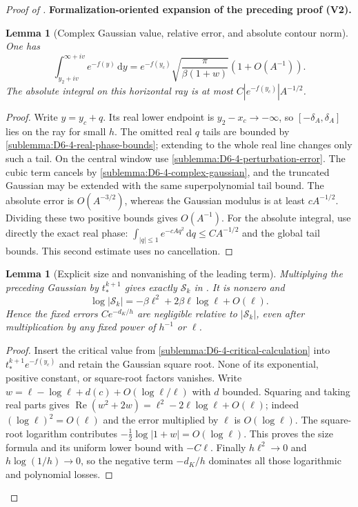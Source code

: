 \documentclass[11pt]{article}
\newtheorem{lemma}[theorem]{Lemma}
\newcommand{\formalisationparentid}{X}
\newenvironment{formalisationaddition}[1]{\par\medskip\begingroup\color{blue}\def\formalisationparentid{#1}\setcounter{formalizationsublemma}{0}\let\lemma\formalizationsublemma\let\endlemma\endformalizationsublemma
  \def\Eo{\mathcal E_h^\circ}\def\EE{\mathcal E_h}\def\phio{\phi_h^\circ}\def\phih{\phi_h}\def\Ho{H_h^{\rm atom}(v^\circ)}\def\Ha{H_h^{\rm atom}}\def\HL{H_h^{L}}\def\Dh{D_h}\def\Log{\operatorname{Log}}\def\ellh{\ell_h}\def\Gp{G_{p,h}}\def\Ast{A_{*,h}}\def\ahat{\widehat{\mathfrak a}_h}\def\ah{\mathfrak a_h}\def\rh{\widehat\rho_h}\def\deltah{\widehat\delta_h}\def\oldref##1{\textup{(##1)}}\def\interface##1{\par\noindent\textit{Analytical interface used here.} ##1\par}\def\finish{\par\noindent\textit{Conclusion of the formalization-oriented expansion.} }\par\noindent\textbf{Formalization-oriented expansion of the preceding proof (V2).}\par\smallskip
}{\par\endgroup\medskip
}
\newcommand{\Rea}{\operatorname{Re}}
\begin{document}
\begin{proof}[Proof of ]
\begin{formalisationaddition}{D-T6.4}
\begin{lemma}[Complex Gaussian value, relative error, and absolute contour norm]\label{sublemma:D6-4-gaussian-evaluation}
One has
\[
 \int_{y_2+iv}^{\infty+iv}e^{-f(y)}\,\mathrm dy
 =e^{-f(y_c)}\sqrt{\frac\pi{\beta(1+w)}}(1+O(A^{-1})).
\]
The absolute integral on this horizontal ray is at most
$C|e^{-f(y_c)}|A^{-1/2}$.
\end{lemma}
\begin{proof}
Write $y=y_c+q$. Its real lower endpoint is $y_2-x_c\to-\infty$,
so $[-\delta_A,\delta_A]$ lies on the ray for small $h$.
The omitted real $q$ tails are bounded by
\ref{sublemma:D6-4-real-phase-bounds}; extending to the whole real line
changes only such a tail. On the central window use
\ref{sublemma:D6-4-perturbation-error}. The cubic term cancels by
\ref{sublemma:D6-4-complex-gaussian}, and the truncated Gaussian may
be extended with the same superpolynomial tail bound.
The absolute error is $O(A^{-3/2})$, whereas the Gaussian modulus is
at least $cA^{-1/2}$. Dividing these two positive bounds gives $O(A^{-1})$.
For the absolute integral, use directly the exact real phase:
$\int_{|q|\le1}e^{-cAq^2}\,\mathrm dq\le CA^{-1/2}$ and the
global tail bounds. This second estimate uses no cancellation.
\end{proof}

\begin{lemma}[Explicit size and nonvanishing of the leading term]\label{sublemma:D6-4-leading-size}
Multiplying the preceding Gaussian by $t_*^{k+1}$ gives exactly $\mathcal S_k$
in . It is nonzero and
\[
 \log|\mathcal S_k|=-\beta\ell^2+2\beta\ell\log\ell+O(\ell).
\]
Hence the fixed errors $Ce^{-d_K/h}$ are negligible relative to $|\mathcal S_k|$,
even after multiplication by any fixed power of $h^{-1}$ or $\ell$.
\end{lemma}
\begin{proof}
Insert the critical value from
\ref{sublemma:D6-4-critical-calculation} into $t_*^{k+1}e^{-f(y_c)}$
and retain the Gaussian square root. None of its exponential, positive
constant, or square-root factors vanishes.
Write $w=\ell-\log\ell+d(c)+O(\log\ell/\ell)$ with $d$ bounded.
Squaring and taking real parts gives
$\Rea(w^2+2w)=\ell^2-2\ell\log\ell+O(\ell)$;
indeed $(\log\ell)^2=O(\ell)$ and the error multiplied by $\ell$
is $O(\log\ell)$. The square-root logarithm contributes
$-\tfrac12\log|1+w|=O(\log\ell)$.
This proves the size formula and its uniform lower bound with $-C\ell$.
Finally $h\ell^2\to0$ and $h\log(1/h)\to0$, so the negative term
$-d_K/h$ dominates all those logarithmic and polynomial losses.
\end{proof}


\end{formalisationaddition}
\end{proof}
\end{document}
